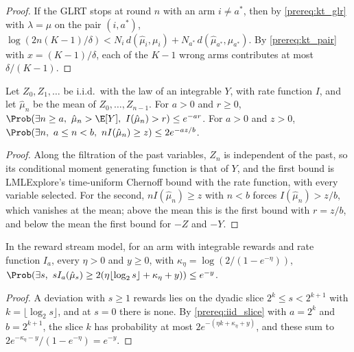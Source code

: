 \begin{proof}
  \leanok
  If the GLRT stops at round $n$ with an arm $i \ne a^*$, then by \cref{prereq:kt_glr} with
  $\lambda = \mu$ on the pair $(i, a^*)$,
  $\log(2n(K-1)/\delta) < N_i\, d(\hat\mu_i, \mu_i) + N_{a^*}\, d(\hat\mu_{a^*}, \mu_{a^*})$.
  By \cref{prereq:kt_pair} with $x = (K-1)/\delta$, each of the $K - 1$ wrong arms contributes at
  most $\delta/(K-1)$.
\end{proof}

\begin{lemma}
  \label{prereq:iid_slice}
  \leanok
  Let $Z_0, Z_1, \dots$ be i.i.d.\ with the law of an integrable $Y$, with rate function $I$, and
  let $\hat\mu_n$ be the mean of $Z_0, \dots, Z_{n-1}$. For $a > 0$ and $r \ge 0$,
  $\Prob(\exists n \ge a,\ \hat\mu_n > \E[Y],\ I(\hat\mu_n) > r) \le e^{-ar}$. For $a > 0$ and
  $z > 0$, $\Prob(\exists n,\ a \le n < b,\ n I(\hat\mu_n) \ge z) \le 2 e^{-az/b}$.
\end{lemma}

\begin{proof}
  \leanok
  Along the filtration of the past variables, $Z_n$ is independent of the past, so its
  conditional moment generating function is that of $Y$, and the first bound is LMLExplore's
  time-uniform Chernoff bound with the rate function, with every variable selected. For the
  second, $n I(\hat\mu_n) \ge z$ with $n < b$ forces $I(\hat\mu_n) > z/b$, which vanishes at the
  mean; above the mean this is the first bound with $r = z/b$, and below the mean the first bound
  for $-Z$ and $-Y$.
\end{proof}

\begin{lemma}
  \label{prereq:peeled_arm}
  \leanok
  In the reward stream model, for an arm with integrable rewards and rate function $I_a$, every
  $\eta > 0$ and $y \ge 0$, with $\kappa_\eta = \log(2/(1 - e^{-\eta}))$,
  $\Prob(\exists s,\ s I_a(\hat\mu_s) \ge 2(\eta \lfloor\log_2 s\rfloor + \kappa_\eta + y))
  \le e^{-y}$.
\end{lemma}

\begin{proof}
  \leanok
  A deviation with $s \ge 1$ rewards lies on the dyadic slice $2^k \le s < 2^{k+1}$ with
  $k = \lfloor\log_2 s\rfloor$, and at $s = 0$ there is none. By \cref{prereq:iid_slice} with
  $a = 2^k$ and $b = 2^{k+1}$, the slice $k$ has probability at most
  $2 e^{-(\eta k + \kappa_\eta + y)}$, and these sum to
  $2 e^{-\kappa_\eta - y} / (1 - e^{-\eta}) = e^{-y}$.
\end{proof}

